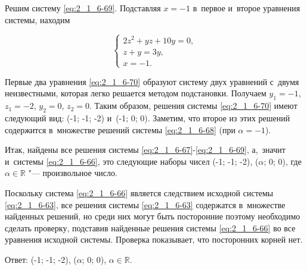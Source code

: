 Решим систему \eqref{eq:2_1_6-69}. Подставляя $x = -1$ в~первое и~второе уравнения
системы, находим

\begin{equation}\label{eq:2_1_6-70}
\begin{cases}
2z^{2} + yz + 10y = 0, \\
z + y = 3y, \\
x = -1.
\end{cases}
\end{equation}

Первые два уравнения \eqref{eq:2_1_6-70} образуют систему двух уравнений
с~двумя неизвестными, которая легко решается методом подстановки.
Получаем $y_1 = -1$, $z_1 = -2$, $y_2 = 0$, $z_2 = 0$.
Таким образом, решения системы \eqref{eq:2_1_6-70} имеют следующий вид:
(-1; -1; -2) и~(-1; 0; 0). Заметим, что второе из этих решений содержится
в~множестве решений системы \eqref{eq:2_1_6-68} (при $\alpha = -1$).

Итак, найдены все решения системы \eqref{eq:2_1_6-67}-\eqref{eq:2_1_6-69},
а,~значит и~системы \eqref{eq:2_1_6-66}, это следующие наборы чисел
(-1; -1; -2), ($\alpha$; 0; 0), где $\alpha \in \mathbb{R}$ "--- произвольное
число.

Поскольку система \eqref{eq:2_1_6-66} является следствием исходной системы
\eqref{eq:2_1_6-63}, все решения системы \eqref{eq:2_1_6-63} содержатся в~множестве
найденных решений, но среди них могут быть посторонние поэтому необходимо
сделать проверку, подставив найденные решения системы \eqref{eq:2_1_6-66}
во все уравнения исходной системы. Проверка показывает, что посторонних
корней нет.

Ответ: (-1; -1; -2), ($\alpha$; 0; 0), $\alpha \in \mathbb{R}$.


